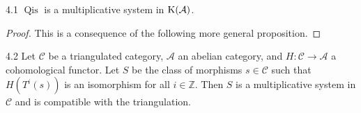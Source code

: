 \begin{bookproposition}{4.1}\label{prop:1.4.1}
	$\operatorname{Qis}$
is a multiplicative system in $\operatorname{K}(\mathcal{A})$.

\end{bookproposition}
\begin{proof}

This is a consequence of the following more general proposition.
\end{proof}
\begin{bookproposition}{4.2}\label{prop:1.4.2}
Let $\mathcal{C}$ be a triangulated category, $\mathcal{A}$ an abelian category, and $H\colon\mathcal{C}\to\mathcal{A}$ a cohomological functor. Let $S$ be the class of morphisms $s\in\mathcal{C}$ such that $H(T^i(s))$ is an isomorphism for all $i\in\mathbb{Z}$. Then $S$ is a multiplicative system in $\mathcal{C}$ and is compatible with the triangulation.
\end{bookproposition}


